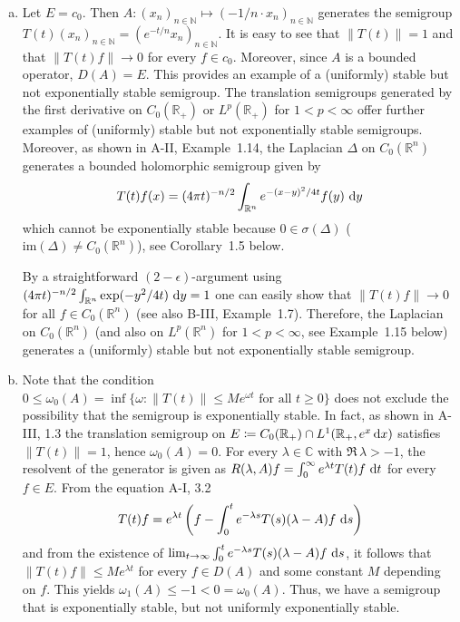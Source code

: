 \begin{example}\label{ex:a4-1.2}
\begin{enumerate}[(a), wide]
\item 
Let $E = c_{0}$. 
Then $A: (x_{n})_{n \in \mathbb{N}} \mapsto (-1/n \cdot x_{n})_{n \in \mathbb{N}}$ generates the semigroup $T(t)(x_{n})_{n \in \mathbb{N}} = (e^{-t/n} x_{n})_{n \in \mathbb{N}}$.
It is easy to see that $\|T(t)\|=1$ and that $\|T(t)f\|\to 0$ for every $f \in c_{0}$.
Moreover, since $A$ is a bounded operator, $D(A) = E$.
This provides an example of a (uniformly) stable but not exponentially stable semigroup.
The translation semigroups generated by the first derivative on $C_0(\mathbb{R}_{+})$ or $L^{p}(\mathbb{R}_{+})$ for $1 < p < \infty$ offer further examples of (uniformly) stable but not exponentially stable semigroups.
Moreover, as shown in A-II, Example~1.14, the Laplacian $\Delta$ on $C_0(\mathbb{R}^{n})$ generates a bounded holomorphic semigroup given by
\[
T(t)f(x) = (4\pi t)^{-n/2} \int_{\mathbb{R}^{n}} e^{-(x-y)^{2}/4t} f(y) \,\mathop{}\!\mathrm{d}{y}
\]
which cannot be exponentially stable because $0 \in \sigma(\Delta)$ ($\text{im}(\Delta) \not= C_0(\mathbb{R}^{n})$), see Corollary~1.5 below.

By a straightforward $(2-\epsilon)$-argument using $(4\pi t)^{-n/2}\int_{\mathbb{R}^{n}} \exp(-y^{2}/4t) \,\mathop{}\!\mathrm{d}{y} = 1$ one can easily show that $\|T(t)f\| \to 0$ for all $f \in C_0(\mathbb{R}^{n})$ (see also B-III, Example~1.7).
Therefore, the Laplacian on $C_0(\mathbb{R}^{n})$ (and also on $L^{p}(\mathbb{R}^{n})$ for $1 < p < \infty$, see Example~1.15 below) generates a (uniformly) stable but not exponentially stable semigroup.

\item 
Note that the condition $0 \leq \omega_0(A) = \inf\{\omega : \|T(t)\| \leq Me^{\omega t} \text{ for all } t \geq 0\}$ does not exclude the possibility that the semigroup is exponentially stable.
In fact, as shown in A-III, 1.3 the translation semigroup on $E \coloneqq C_0(\mathbb{R}_{+}) \cap L^{1}(\mathbb{R}_{+},e^{x}\mathop{}\!\mathrm{d}{x})$ satisfies $\|T(t)\| = 1$, hence $\omega_0(A) = 0$. 
For every $\lambda \in \mathbb{C}$ with $\Re\,\lambda > -1$, the resolvent of the generator is given as $R(\lambda,A)f = \int_{0}^{\infty} e^{\lambda t} T(t)f \,\mathop{}\!\mathrm{d}{t}$ for every $f \in E$.
From the equation A-I, 3.2
\[
T(t)f = e^{\lambda t}\left(f - \int_{0}^{t} e^{-\lambda s} T(s) (\lambda - A)f \,\mathop{}\!\mathrm{d}{s}\right)
\]
and from the existence of $\lim_{t \to \infty} \int_{0}^{t} e^{-\lambda s} T(s) (\lambda - A)f \,\mathop{}\!\mathrm{d}{s}$, it follows that 
$\|T(t)f\| \leq Me^{\lambda t}$ for every $f \in D(A)$ and some constant $M$ depending on $f$. This yields $\omega_{1}(A) \le -1 < 0 = \omega_0(A)$. 
Thus, we have a semigroup that is exponentially stable, but not uniformly exponentially stable.


\end{enumerate}
\end{example}
